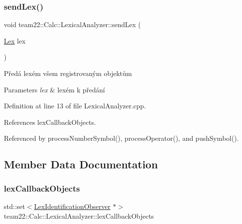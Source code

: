 \mbox{\label{classteam22_1_1_calc_1_1_lexical_analyzer_afd6bb48e5de7f8490addc9b326bfeb49}} 
\subsubsection{\texorpdfstring{send\+Lex()}{sendLex()}}
{\footnotesize\ttfamily void team22\+::\+Calc\+::\+Lexical\+Analyzer\+::send\+Lex (\begin{DoxyParamCaption}\item[{\hyperlink{classteam22_1_1_calc_1_1_lex}{Lex}}]{lex }\end{DoxyParamCaption})\hspace{0.3cm}{\ttfamily [private]}}

Předá lexém všem registrovaným objektům 
\begin{DoxyParams}{Parameters}
{\em lex} & lexém k předání \\
\hline
\end{DoxyParams}


Definition at line 13 of file Lexical\+Analyzer.\+cpp.



References lex\+Callback\+Objects.



Referenced by process\+Number\+Symbol(), process\+Operator(), and push\+Symbol().



\subsection{Member Data Documentation}
\mbox{\label{classteam22_1_1_calc_1_1_lexical_analyzer_ab8018dc24a6f4e188a901c83bbd9fdb1}} 
\subsubsection{\texorpdfstring{lex\+Callback\+Objects}{lexCallbackObjects}}
{\footnotesize\ttfamily std\+::set$<$\hyperlink{classteam22_1_1_calc_1_1_lex_identification_observer}{Lex\+Identification\+Observer} $\ast$$>$ team22\+::\+Calc\+::\+Lexical\+Analyzer\+::lex\+Callback\+Objects\hspace{0.3cm}{\ttfamily [private]}}

